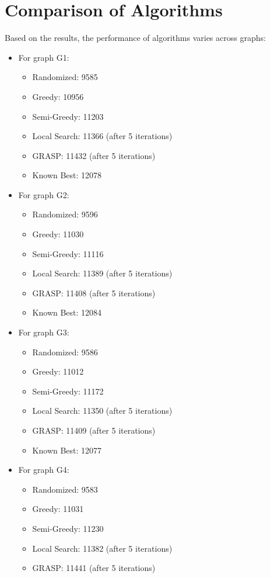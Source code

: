 \documentclass{article}%
\begin{document}
\section{Comparison of Algorithms}%
\label{sec:ComparisonofAlgorithms}%
Based on the results, the performance of algorithms varies across graphs:%
\begin{itemize}%
\item For graph G1:%
\begin{itemize}%
\item Randomized: 9585%
\item Greedy: 10956%
\item Semi-Greedy: 11203%
\item Local Search: 11366 (after 5 iterations)%
\item GRASP: 11432 (after 5 iterations)%
\item Known Best: 12078%
\end{itemize}%
\item For graph G2:%
\begin{itemize}%
\item Randomized: 9596%
\item Greedy: 11030%
\item Semi-Greedy: 11116%
\item Local Search: 11389 (after 5 iterations)%
\item GRASP: 11408 (after 5 iterations)%
\item Known Best: 12084%
\end{itemize}%
\item For graph G3:%
\begin{itemize}%
\item Randomized: 9586%
\item Greedy: 11012%
\item Semi-Greedy: 11172%
\item Local Search: 11350 (after 5 iterations)%
\item GRASP: 11409 (after 5 iterations)%
\item Known Best: 12077%
\end{itemize}%
\item For graph G4:%
\begin{itemize}%
\item Randomized: 9583%
\item Greedy: 11031%
\item Semi-Greedy: 11230%
\item Local Search: 11382 (after 5 iterations)%
\item GRASP: 11441 (after 5 iterations)%

\end{itemize}
\end{itemize}
\end{document}
